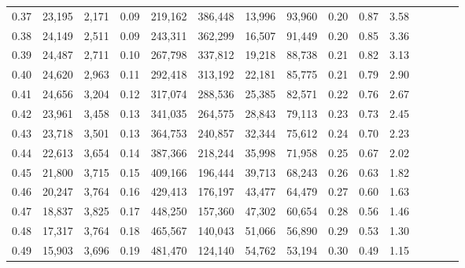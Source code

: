 \begin{tabular}{rrrcrrrrrrrrrrr}
0.37 &  23,195 &  2,171 &                                       0.09 &  219,162 &  386,448 &   13,996 &   93,960 &  0.20 &  0.87 &                         3.58 \\
0.38 &  24,149 &  2,511 &                                       0.09 &  243,311 &  362,299 &   16,507 &   91,449 &  0.20 &  0.85 &                         3.36 \\
0.39 &  24,487 &  2,711 &                                       0.10 &  267,798 &  337,812 &   19,218 &   88,738 &  0.21 &  0.82 &                         3.13 \\
0.40 &  24,620 &  2,963 &                                       0.11 &  292,418 &  313,192 &   22,181 &   85,775 &  0.21 &  0.79 &                         2.90 \\
0.41 &  24,656 &  3,204 &                                       0.12 &  317,074 &  288,536 &   25,385 &   82,571 &  0.22 &  0.76 &                         2.67 \\
0.42 &  23,961 &  3,458 &                                       0.13 &  341,035 &  264,575 &   28,843 &   79,113 &  0.23 &  0.73 &                         2.45 \\
0.43 &  23,718 &  3,501 &                                       0.13 &  364,753 &  240,857 &   32,344 &   75,612 &  0.24 &  0.70 &                         2.23 \\
0.44 &  22,613 &  3,654 &                                       0.14 &  387,366 &  218,244 &   35,998 &   71,958 &  0.25 &  0.67 &                         2.02 \\
0.45 &  21,800 &  3,715 &                                       0.15 &  409,166 &  196,444 &   39,713 &   68,243 &  0.26 &  0.63 &                         1.82 \\
0.46 &  20,247 &  3,764 &                                       0.16 &  429,413 &  176,197 &   43,477 &   64,479 &  0.27 &  0.60 &                         1.63 \\
0.47 &  18,837 &  3,825 &                                       0.17 &  448,250 &  157,360 &   47,302 &   60,654 &  0.28 &  0.56 &                         1.46 \\
0.48 &  17,317 &  3,764 &                                       0.18 &  465,567 &  140,043 &   51,066 &   56,890 &  0.29 &  0.53 &                         1.30 \\
0.49 &  15,903 &  3,696 &                                       0.19 &  481,470 &  124,140 &   54,762 &   53,194 &  0.30 &  0.49 &                         1.15 \\

\end{tabular}
